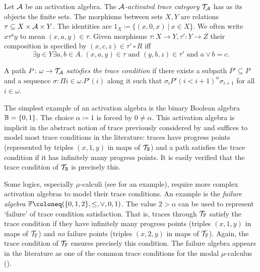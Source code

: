\begin{definition}\label{def:aa-activ-tc}
  Let $\mathcal{A}$ be an activation algebra.
  The \emph{$\mathcal{A}$-activated trace category $\mathcal{T}_{\mathcal{A}}$} has as its objects the finite sets. The
  morphisms between sets $X, Y$ are relations $\tau \subseteq X \times \mathcal{A}
  \times Y$.
  The identities are $1_X \coloneq \{(x, 0, x) ~|~ x \in X\}$. We often write $x \tau^a y$ to mean $(x, a, y) \in \tau$.
  Given morphisms $\tau \colon X \to Y, \tau' \colon Y \to Z$ their composition is specified by $(x, c, z) \in \tau' \circ R$ iff
  \[\exists y \in Y \exists a, b
    \in A.\;(x, a, y)
    \in \tau \text{ and } (y, b, z) \in \tau' \text{ and } a \vee b = c.\]

  A path $P \colon \omega \to \mathcal{T}_{\mathcal{A}}$
  \emph{satisfies the trace condition} if there exists a subpath $P' \subseteq
  P$ and a sequence $\sigma \colon \Pi i \in \omega. P'(i)$ along it such that $\sigma_i P'(i <
  i + 1)^\alpha \sigma_{i + 1}$ for all $i \in \omega$.
\end{definition}

\begin{example}
  The simplest example of an activation algebra is the binary Boolean algebra $\mathbb{B} =
  \{0, 1\}$.
  The choice $\alpha \coloneq 1$ is forced by $0 \neq \alpha$.
  This activation algebra is implicit in the
  abstract notion of trace previously considered by \textcite{brotherstonSequentCalculusProof2006}
  and suffices to model most trace conditions in the literature:
  traces have
  progress points (represented by triples $(x, 1, y)$ in maps of $\mathcal{T}_{\mathbb{B}}$) and a
  path satisfies the trace condition if it has infinitely many progress points.
  It is easily verified that the trace condition of $\mathcal{T}_{\mathbb{B}}$ is precisely this.
\end{example}

\begin{example}
  Some logics, especially $\mu$-calculi (see  for an example), require more complex activation algebras
  to model their trace conditions. An example is the \emph{failure algebra} $\FF
  \coloneq (\{0, 1, 2\}, \leq, \vee, 0, 1)$. The value $2 > \alpha$ can be used to
  represent `failure' of trace condition satisfaction. That is,
  traces through $\mathcal{T}_{\mathbb{F}}$ satisfy the trace condition if they have
  infinitely many progress points (triples $(x, 1, y)$ in maps of $\mathcal{T}_{\mathbb{F}}$) and
  \emph{no} failure points (triples $(x, 2, y)$ in maps of $\mathcal{T}_{\mathbb{F}}$). Again,
  the trace condition of $\mathcal{T}_{\mathbb{F}}$ ensures precisely this condition.
  The failure
  algebra appears in the literature as one of the common trace conditions for
  the modal $\mu$-calculus ().
\end{example}

